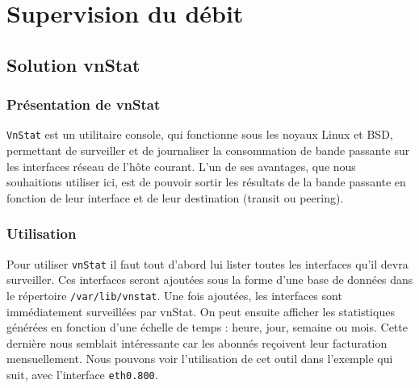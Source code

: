 \section{Supervision du débit}
	\subsection{Solution vnStat}
		\subsubsection{Présentation de vnStat}
			\vspace{0.3cm}
			
			\verb?VnStat? est un utilitaire console, qui fonctionne sous les noyaux Linux et BSD, permettant de surveiller et de journaliser la consommation de bande passante sur les interfaces réseau de l'hôte courant. L'un de ses avantages, que nous souhaitions utiliser ici, est de pouvoir sortir les résultats de la bande passante en fonction de leur interface et de leur destination (transit ou peering).\\

		\subsubsection{Utilisation}
			\vspace{0.3cm}
			Pour utiliser \verb?vnStat? il faut tout d'abord lui lister toutes les interfaces qu'il devra surveiller. Ces interfaces seront ajoutées sous la forme d'une base de données dans le répertoire \verb?/var/lib/vnstat?. Une fois ajoutées, les interfaces sont immédiatement surveillées par vnStat. On peut ensuite afficher les statistiques générées en fonction d'une échelle de temps : heure, jour, semaine ou mois. Cette dernière nous semblait intéressante car les abonnés reçoivent leur facturation mensuellement. Nous pouvons voir l'utilisation de cet outil dans l'exemple qui suit, avec l'interface \verb?eth0.800?.\\

